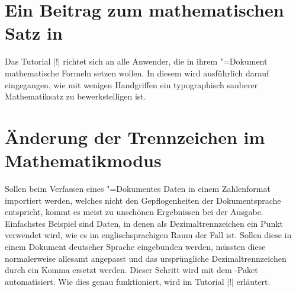 \section{Ein Beitrag zum mathematischen Satz in }
\label{sec:exmpl:mathtype}
Das Tutorial |!| richtet sich an alle Anwender, die in ihrem 
"=Dokument mathematische Formeln setzen wollen. In diesem wird 
ausführlich darauf eingegangen, wie mit wenigen Handgriffen ein typographisch 
sauberer Mathematiksatz zu bewerkstelligen ist.

\section{Änderung der Trennzeichen im Mathematikmodus}
\label{sec:exmpl:mathswap}
Sollen beim Verfassen eines "=Dokumentes Daten in einem 
Zahlenformat importiert werden, welches nicht den Gepflogenheiten der 
Dokumentsprache entspricht, kommt es meist zu unschönen Ergebnissen bei der 
Ausgabe. Einfachstes Beispiel sind Daten, in denen als Dezimaltrennzeichen ein 
Punkt verwendet wird, wie es im englischsprachigen Raum der Fall ist. Sollen 
diese in einem Dokument deutscher Sprache eingebunden werden, müssten diese 
normalerweise allesamt angepasst und das ursprüngliche Dezimaltrennzeichen 
durch ein Komma ersetzt werden. Dieser Schritt wird mit dem \TUDScript-Paket 
 automatisiert. Wie dies genau funktioniert, wird im Tutorial 
|!| erläutert.
